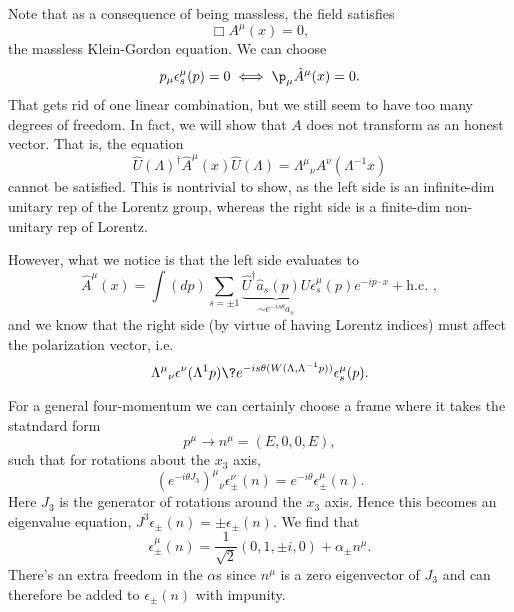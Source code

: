 Note that as a consequence of being massless, the field satisfies
\begin{equation}
    \Box A^\mu(x)=0,
\end{equation}
the massless Klein-Gordon equation. We can choose
\begin{equation}
    p_\mu \epsilon_s^\mu (p)=0 \iff \p_\mu \hat A^\mu(x)=0.
\end{equation}
That gets rid of one linear combination, but we still seem to have too many degrees of freedom. In fact, we will show that $A$ does not transform as an honest vector. That is, the equation
\begin{equation}
    \hat U(\Lambda)^\dagger \hat A^\mu(x) \hat U(\Lambda) = \Lambda^\mu{}_\nu A^\nu(\Lambda^{-1}x)
\end{equation}
cannot be satisfied. This is nontrivial to show, as the left side is an infinite-dim unitary rep of the Lorentz group, whereas the right side is a finite-dim non-unitary rep of Lorentz.

However, what we notice is that the left side evaluates to
\begin{equation}
    \hat A^\mu(x) = \int(dp)\sum_{s=\pm 1} \underbrace{\hat U^\dagger \hat a_s (p) U}_{\sim e^{-is\theta}a_s} \epsilon_s^\mu(p) e^{-ip\cdot x} + \text{h.c. },
\end{equation}
and we know that the right side (by virtue of having Lorentz indices) must affect the polarization vector, i.e.
\begin{equation}
    \Lambda^\mu{}_\nu \epsilon^\nu(\Lambda^{1} p) \? e^{-is \theta(W(\Lambda,\Lambda^{-1}p))}\epsilon_s^\mu(p).
\end{equation}

For a general four-momentum we can certainly choose a frame where it takes the statndard form
\begin{equation}
    p^\mu \to n^\mu = (E,0,0,E),
\end{equation}
such that for rotations about the $x_3$ axis,
\begin{equation}
     (e^{-i\theta J_3})^\mu{}_\nu \epsilon^\nu_\pm(n) = e^{-i\theta}\epsilon_\pm^\mu(n).
\end{equation}
Here $J_3$ is the generator of rotations around the $x_3$ axis. Hence this becomes an eigenvalue equation, $J^3 \epsilon_\pm(n) = \pm \epsilon_\pm(n)$. We find that
\begin{equation}
    \epsilon_\pm^\mu(n) =\frac{1}{\sqrt{2}}(0,1,\pm i,0)+ \alpha_\pm n^\mu.
\end{equation}
There's an extra freedom in the $\alpha$s since $n^\mu$ is a zero eigenvector of $J_3$ and can therefore be added to $\epsilon_\pm(n)$ with impunity.

